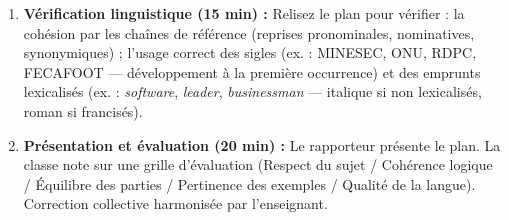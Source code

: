 \documentclass[11pt]{article}
\newcommand{\cle}[1]{{\popxbold\color{popdark}#1}}
\begin{document}
\begin{enumerate}
\begin{itemize}
    \end{itemize}
    \item \textbf{Vérification linguistique (15 min) :} Relisez le plan pour vérifier : la cohésion par les \cle{chaînes de référence} (reprises pronominales, nominatives, synonymiques) ; l'usage correct des \cle{sigles} (ex. : MINESEC, ONU, RDPC, FECAFOOT — développement à la première occurrence) et des \cle{emprunts} lexicalisés (ex. : \emph{software}, \emph{leader}, \emph{businessman} — italique si non lexicalisés, roman si francisés).
    \item \textbf{Présentation et évaluation (20 min) :} Le rapporteur présente le plan. La classe note sur une grille d'évaluation (Respect du sujet / Cohérence logique / Équilibre des parties / Pertinence des exemples / Qualité de la langue). Correction collective harmonisée par l'enseignant.
\end{enumerate}
\end{document}
